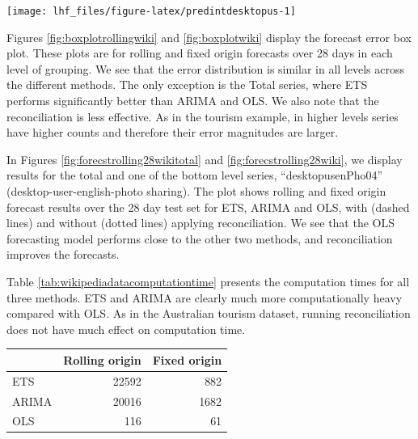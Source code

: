 \documentclass[11pt,a4paper,]{article}
\let\origfigure\figure
\let\endorigfigure\endfigure
\renewenvironment{figure}[1][2] {
    \expandafter\origfigure\expandafter[!htbp]
} {
    \endorigfigure
}
\let\origtable\table
\let\endorigtable\endtable
\renewenvironment{table}[1][2] {
    \expandafter\origtable\expandafter[!htbp]
} {
    \endorigtable
}
\begin{document}
\begin{figure}

{\centering \texttt{[image: lhf\_files/figure-latex/predintdesktopus-1]} 

}

\caption{The actual test set for the 'desktopusenPho04' bottom level series compared to the forecasts from reconciled and unreconciled OLS methods with prediction interval for rolling and fixed origin  Wikipedia pageviews.}\label{fig:predintdesktopus}
\end{figure}

Figures \ref{fig:boxplotrollingwiki} and \ref{fig:boxplotwiki} display the forecast error box plot. These plots are for rolling and fixed origin forecasts over 28 days in each level of grouping. We see that the error distribution is similar in all levels across the different methods. The only exception is the Total series, where ETS performs significantly better than ARIMA and OLS. We also note that the reconciliation is less effective. As in the tourism example, in higher levels series have higher counts and therefore their error magnitudes are larger.

In Figures \ref{fig:forecstrolling28wikitotal} and \ref{fig:forecstrolling28wiki}, we display results for the total and one of the bottom level series, ``desktopusenPho04'' (desktop-user-english-photo sharing). The plot shows rolling and fixed origin forecast results over the 28 day test set for ETS, ARIMA and OLS, with (dashed lines) and without (dotted lines) applying reconciliation. We see that the OLS forecasting model performs close to the other two methods, and reconciliation improves the forecasts.

Table \ref{tab:wikipediadatacomputationtime} presents the computation times for all three methods. ETS and ARIMA are clearly much more computationally heavy compared with OLS. As in the Australian tourism dataset, running reconciliation does not have much effect on computation time.

\begin{table}

\caption{\label{tab:wikipediadatacomputationtime}Computation time (seconds) for ETS, ARIMA and OLS with reconciliation - Rolling and fixed origin forecasts - Wikipedia dataset}
\centering
\begin{tabular}[t]{lrr}
\toprule
 & Rolling origin & Fixed origin\\
\midrule
ETS & 22592 & 882\\
ARIMA & 20016 & 1682\\
OLS & 116 & 61\\
\bottomrule
\end{tabular}
\end{table}

\clearpage

\printbibliography
\end{document}
